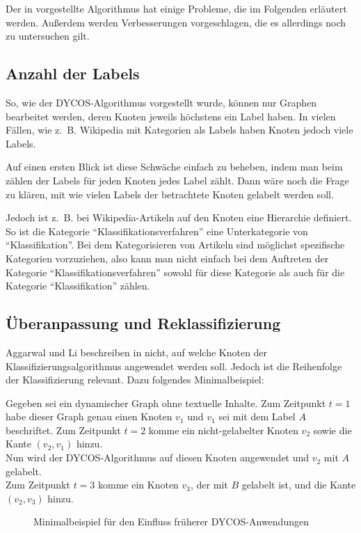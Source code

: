 Der in \cite{aggarwal2011} vorgestellte Algorithmus hat einige Probleme,
die im Folgenden erläutert werden. Außerdem werden Verbesserungen
vorgeschlagen, die es allerdings noch zu untersuchen gilt.

\subsection{Anzahl der Labels}
So, wie der DYCOS-Algorithmus vorgestellt wurde, können nur Graphen bearbeitet werden, 
deren Knoten jeweils höchstens ein Label haben. In vielen Fällen, wie z.~B. 
Wikipedia mit Kategorien als Labels haben Knoten jedoch viele Labels.

Auf einen ersten Blick ist diese Schwäche einfach zu beheben, indem 
man beim zählen der Labels für jeden Knoten jedes Label zählt. Dann
wäre noch die Frage zu klären, mit wie vielen Labels der betrachtete
Knoten gelabelt werden soll.

Jedoch ist z.~B. bei Wikipedia-Artikeln auf den Knoten eine 
Hierarchie definiert. So ist die Kategorie \enquote{Klassifikationsverfahren}
eine Unterkategorie von \enquote{Klassifikation}. Bei dem Kategorisieren
von Artikeln sind möglichst spezifische Kategorien vorzuziehen, also
kann man nicht einfach bei dem Auftreten der Kategorie \enquote{Klassifikationsverfahren}
sowohl für diese Kategorie als auch für die Kategorie \enquote{Klassifikation}
zählen.


\subsection{Überanpassung und Reklassifizierung}
Aggarwal und Li beschreiben in \cite{aggarwal2011} nicht, auf welche
Knoten der Klassifizierungsalgorithmus angewendet werden soll. Jedoch
ist die Reihenfolge der Klassifizierung relevant. Dazu folgendes 
Minimalbeispiel:

Gegeben sei ein dynamischer Graph ohne textuelle Inhalte. Zum Zeitpunkt
$t=1$ habe dieser Graph genau einen Knoten $v_1$ und $v_1$  sei
mit dem Label $A$ beschriftet. Zum Zeitpunkt $t=2$ komme ein nicht-gelabelter
Knoten $v_2$ sowie die Kante $(v_2, v_1)$ hinzu.\\
Nun wird der DYCOS-Algorithmus auf diesen Knoten angewendet und
$v_2$ mit $A$ gelabelt.\\
Zum Zeitpunkt $t=3$ komme ein Knoten $v_3$, der mit $B$ gelabelt ist,
und die Kante $(v_2, v_3)$ hinzu.

\begin{figure}[ht]
    \centering
    \subfloat[$t=1$]{
        
        \label{fig:graph-t1}
    }%
    \subfloat[$t=2$]{
        
        \label{fig:graph-t2}
    }

    \subfloat[$t=3$]{
        
        \label{fig:graph-t3}
    }%
    \subfloat[$t=4$]{
        
        \label{fig:graph-t4}
    }%
    \label{Formen}
    \caption{Minimalbeispiel für den Einfluss früherer DYCOS-Anwendungen}
\end{figure}

